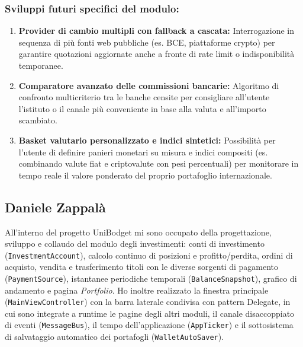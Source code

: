 \documentclass[11pt,a4paper,openright]{report}
\begin{document}
\subsubsection*{Sviluppi futuri specifici del modulo:}
\begin{enumerate}
  \item \textbf{Provider di cambio multipli con fallback a cascata:} Interrogazione in sequenza di più fonti web pubbliche (es. BCE, piattaforme crypto) per garantire quotazioni aggiornate anche a fronte di rate limit o indisponibilità temporanee.
  \item \textbf{Comparatore avanzato delle commissioni bancarie:} Algoritmo di confronto multicriterio tra le banche censite per consigliare all'utente l'istituto o il canale più conveniente in base alla valuta e all'importo scambiato.
  \item \textbf{Basket valutario personalizzato e indici sintetici:} Possibilità per l'utente di definire panieri monetari su misura e indici compositi (es. combinando valute fiat e criptovalute con pesi percentuali) per monitorare in tempo reale il valore ponderato del proprio portafoglio internazionale.
\end{enumerate}

\clearpage
\subsection{Daniele Zappalà}

All'interno del progetto UniBodget mi sono occupato della progettazione, sviluppo e collaudo del modulo degli investimenti: conti di investimento (\texttt{InvestmentAccount}), calcolo continuo di posizioni e profitto/perdita, ordini di acquisto, vendita e trasferimento titoli con le diverse sorgenti di pagamento (\texttt{PaymentSource}), istantanee periodiche temporali (\texttt{BalanceSnapshot}), grafico di andamento e pagina \emph{Portfolio}. Ho inoltre realizzato la finestra principale (\texttt{MainViewController}) con la barra laterale condivisa con pattern Delegate, in cui sono integrate a runtime le pagine degli altri moduli, il canale disaccoppiato di eventi (\texttt{MessageBus}), il tempo dell'applicazione (\texttt{AppTicker}) e il sottosistema di salvataggio automatico dei portafogli (\texttt{WalletAutoSaver}).
\end{document}
